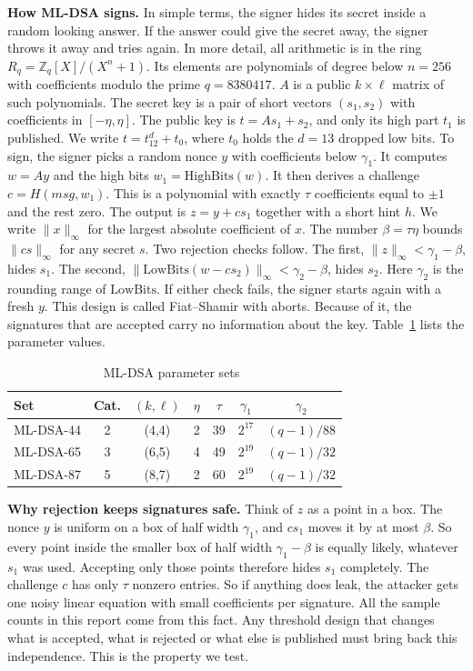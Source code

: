 \documentclass[10pt,conference,a4paper]{IEEEtran}
\newcommand{\HB}{\mathrm{HighBits}}
\newcommand{\LB}{\mathrm{LowBits}}
\newcommand{\norm}[1]{\lVert #1 \rVert_\infty}
\begin{document}
\textbf{How ML-DSA signs.} In simple terms, the signer hides its secret inside a random looking answer. If the answer
could give the secret away, the signer throws it away and tries again. In more detail, all arithmetic is in the ring
$R_q=\mathbb{Z}_q[X]/(X^n+1)$. Its elements are polynomials of degree below $n=256$ with coefficients modulo the prime
$q=8380417$. $A$ is a public $k\times\ell$ matrix of such polynomials. The secret key is a pair of short vectors
$(s_1,s_2)$ with coefficients in $[-\eta,\eta]$. The public key is $t=As_1+s_2$, and only its high part $t_1$ is published.
We write $t=t_12^d+t_0$, where $t_0$ holds the $d=13$ dropped low bits. To sign, the signer picks a random nonce $y$ with
coefficients below $\gamma_1$. It computes $w=Ay$ and the high bits $w_1=\HB(w)$. It then derives a challenge
$c=H(\mathit{msg},w_1)$. This is a polynomial with exactly $\tau$ coefficients equal to $\pm1$ and the rest zero. The
output is $z=y+cs_1$ together with a short hint $h$. We write $\norm{x}$ for the largest absolute coefficient of $x$.
The number $\beta=\tau\eta$ bounds $\norm{cs}$ for any secret $s$. Two rejection checks follow. The first,
$\norm{z}<\gamma_1-\beta$, hides $s_1$. The second, $\norm{\LB(w-cs_2)}<\gamma_2-\beta$, hides $s_2$. Here $\gamma_2$ is
the rounding range of $\LB$. If either check fails, the signer starts again with a fresh $y$. This design is called
Fiat--Shamir with aborts. Because of it, the signatures that are accepted carry no information about the key. Table~\ref{tab:params} lists
the parameter values.

\begin{table}[t]
\caption{ML-DSA parameter sets~\cite{fips204}}\label{tab:params}
\centering\footnotesize
\begin{tabular}{@{}lcccccc@{}}
\toprule
Set & Cat. & $(k,\ell)$ & $\eta$ & $\tau$ & $\gamma_1$ & $\gamma_2$\\
\midrule
ML-DSA-44 & 2 & (4,4) & 2 & 39 & $2^{17}$ & $(q-1)/88$\\
ML-DSA-65 & 3 & (6,5) & 4 & 49 & $2^{19}$ & $(q-1)/32$\\
ML-DSA-87 & 5 & (8,7) & 2 & 60 & $2^{19}$ & $(q-1)/32$\\
\bottomrule
\end{tabular}
\end{table}

\textbf{Why rejection keeps signatures safe.} Think of $z$ as a point in a box. The nonce $y$ is uniform on a box of half
width $\gamma_1$, and $cs_1$ moves it by at most $\beta$. So every point inside the smaller box of half width
$\gamma_1-\beta$ is equally likely, whatever $s_1$ was used. Accepting only those points therefore hides $s_1$ completely.
The challenge $c$ has only $\tau$ nonzero entries. So if anything does leak, the attacker gets one noisy linear equation
with small coefficients per signature. All the sample counts in this report come from this fact. Any threshold design that
changes what is accepted, what is rejected or what else is published must bring back this independence. This is the
property we test.
\end{document}
